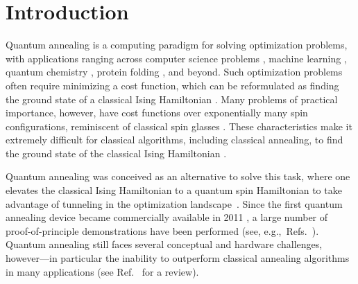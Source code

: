 \documentclass[aps,prd,twocolumn, superscriptaddress,preprintnumbers, nofootinbib,longbibliography,floatfix]{revtex4-2}
\DeclareRobustCommand{\Ref}[1]{Ref.~\cite{#1}}
\DeclareRobustCommand{\Refs}[1]{Refs.~\cite{#1}}
\begin{document}
\maketitle

\tableofcontents


\section{Introduction}
\label{sec:intro}


Quantum annealing \cite{Kadowaki1998,farhi2000quantum,kadowaki2002study} is a computing paradigm for solving optimization problems, with applications ranging across computer science problems \cite{farhi2001quantum}, machine learning \cite{lloyd2013quantum},
quantum chemistry \cite{babbush2014adiabatic}, protein folding \cite{perdomo2012finding}, and beyond.
%
Such optimization problems often require minimizing a cost function, which can be reformulated as finding the ground state of a classical Ising Hamiltonian \cite{Lucas2014}.
%
Many problems of practical importance, however, have cost functions over exponentially many spin configurations, reminiscent of classical spin glasses \cite{Binder1986, nishimori2001statistical, mezard1987spin}.
%
These characteristics make it extremely difficult for classical algorithms, including classical annealing, to find the ground state of the classical Ising Hamiltonian \cite{kadowaki2002study}.


Quantum annealing was conceived as an alternative to solve this task, where one elevates the classical Ising Hamiltonian to a quantum spin Hamiltonian to take advantage of tunneling in the optimization landscape~\cite{kadowaki2002study}.
%
Since the first quantum annealing device became commercially available in 2011 \cite{johnson2011quantum}, a large number of proof-of-principle demonstrations have been performed (see, e.g.,~\Refs{Albash2018,ronnow2014defining,Katzgraber2015,hen2015probing,mott2017solving,PhysRevA.102.062405}).
%
Quantum annealing still faces several conceptual and hardware challenges, however---in particular the inability to outperform classical annealing algorithms in many applications (see \Ref{Hauke2020} for a review).
\end{document}
